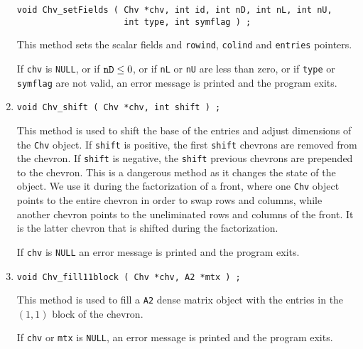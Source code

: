 \begin{enumerate}
\begin{verbatim}
void Chv_setFields ( Chv *chv, int id, int nD, int nL, int nU, 
                     int type, int symflag ) ;
\end{verbatim}
This method sets the scalar fields and {\tt rowind}, {\tt colind}
and {\tt entries} pointers.
\par {}
If {\tt chv} is {\tt NULL},
or if ${\tt nD} \le 0$,
or if {\tt nL} or {\tt nU} are less than zero,
or if {\tt type} or {\tt symflag} are not valid,
an error message is printed and the program exits.
\item
\begin{verbatim}
void Chv_shift ( Chv *chv, int shift ) ;
\end{verbatim}
This method is used to shift the base of the entries and adjust
dimensions of the {\tt Chv} object.
If {\tt shift} is positive,
the first {\tt shift} chevrons are removed from the chevron.
If {\tt shift} is negative,
the {\tt shift} previous chevrons are prepended to the chevron.
This is a dangerous method as it changes the state of the object.
We use it during the factorization of a front, where one {\tt Chv}
object points to the entire chevron in order to swap rows and
columns, while another chevron points to the uneliminated rows
and columns of the front.
It is the latter chevron that is shifted during the factorization. 
\par {}
If {\tt chv} is {\tt NULL}
an error message is printed and the program exits.
\item
\begin{verbatim}
void Chv_fill11block ( Chv *chv, A2 *mtx ) ;
\end{verbatim}
This method is used to fill a {\tt A2} dense matrix object with
the entries in the $(1,1)$ block of the chevron.
\par {}
If {\tt chv} or {\tt mtx} is {\tt NULL},
an error message is printed and the program exits.

\end{enumerate}
